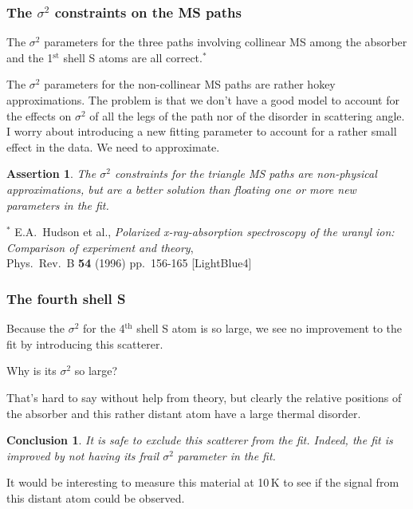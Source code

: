 \documentclass[10pt, xcolor=x11names, compress, handout]{beamer}
\newtheorem{conclusion}[theorem]{Conclusion}
\newtheorem{assertion}[theorem]{Assertion}
\begin{document}
\begin{frame}
  \frametitle{The $\sigma^2$ constraints on the MS paths}
  The $\sigma^2$ parameters for the three paths involving collinear MS
  among the absorber and the 1$^{\mathrm{st}}$ shell S atoms are all
  correct.$^\ast$

  \bigskip

  The $\sigma^2$ parameters for the non-collinear MS paths are rather
  hokey approximations.  The problem is that we don't have a good
  model to account for the effects on $\sigma^2$ of all the legs of
  the path nor of the disorder in scattering angle.  I worry about
  introducing a new fitting parameter to account for a rather small
  effect in the data.  We need to approximate.

  \begin{assertion}
    The $\sigma^2$ constraints for the triangle MS paths are
    non-physical approximations, but are a better solution than
    floating one or more new parameters in the fit.
  \end{assertion}

  \begin{bottomnote}[0.9][18]%
    $^\ast$ E.A.\ Hudson et al., \textit{Polarized x-ray-absorption
      spectroscopy of the uranyl ion: Comparison of experiment and
      theory},\\ Phys.\ Rev.\ B \textbf{54} (1996) pp.\ 156-165
    [LightBlue4]
  \end{bottomnote}
\end{frame}

\begin{frame}
  \frametitle{The fourth shell S}
  Because the $\sigma^2$ for the 4$^{\mathrm{th}}$ shell S atom is so
  large, we see no improvement to the fit by introducing this
  scatterer.  

  \begin{center}
    Why is its $\sigma^2$ so large?
  \end{center}

  That's hard to say without help from theory, but clearly the
  relative positions of the absorber and this rather distant atom have
  a large thermal disorder.

  \begin{conclusion}
    It is safe to exclude this scatterer from the fit.  Indeed, the
    fit is improved by not having its frail $\sigma^2$ parameter in
    the fit.
  \end{conclusion}

  It would be interesting to measure this material at 10\,K to see if
  the signal from this distant atom could be observed.
\end{frame}
\end{document}
